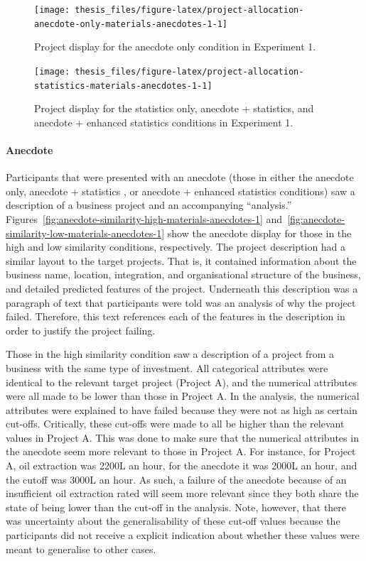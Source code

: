 \documentclass[a4paper, nobind, dvipsnames]{templates/ociamthesis}
\theoremstyle{definition}
\theoremstyle{definition}
\theoremstyle{definition}
\theoremstyle{definition}
\theoremstyle{remark}
\begin{document}
\begin{figure}
\texttt{[image: thesis\_files/figure-latex/project-allocation-anecdote-only-materials-anecdotes-1-1]} \caption{Project display for the anecdote only condition in Experiment 1.}\label{fig:project-allocation-anecdote-only-materials-anecdotes-1}
\end{figure}



\begin{figure}
\texttt{[image: thesis\_files/figure-latex/project-allocation-statistics-materials-anecdotes-1-1]} \caption{Project display for the statistics only, anecdote + statistics, and anecdote + enhanced statistics conditions in Experiment 1.}\label{fig:project-allocation-statistics-materials-anecdotes-1}
\end{figure}

\hypertarget{anecdote}{%
\paragraph{Anecdote}\label{anecdote}}

Participants that were presented with an anecdote (those in either the anecdote
only, anecdote + statistics , or anecdote + enhanced statistics conditions) saw
a description of a business project and an accompanying ``analysis.''
Figures~\ref{fig:anecdote-similarity-high-materials-anecdotes-1}
and~\ref{fig:anecdote-similarity-low-materials-anecdotes-1} show the anecdote
display for those in the high and low similarity conditions, respectively. The
project description had a similar layout to the target projects. That is, it
contained information about the business name, location, integration, and
organisational structure of the business, and detailed predicted features of the
project. Underneath this description was a paragraph of text that participants
were told was an analysis of why the project failed. Therefore, this text
references each of the features in the description in order to justify the
project failing.

Those in the high similarity condition saw a description of a project from a
business with the same type of investment. All categorical attributes were
identical to the relevant target project (Project A), and the numerical
attributes were all made to be lower than those in Project A. In the analysis,
the numerical attributes were explained to have failed because they were not as
high as certain cut-offs. Critically, these cut-offs were made to all be higher
than the relevant values in Project A. This was done to make sure that the
numerical attributes in the anecdote seem more relevant to those in Project A.
For instance, for Project A, oil extraction was 2200L an hour, for the anecdote
it was 2000L an hour, and the cutoff was 3000L an hour. As such, a failure of
the anecdote because of an insufficient oil extraction rated will seem more
relevant since they both share the state of being lower than the cut-off in the
analysis. Note, however, that there was uncertainty about the generalisability
of these cut-off values because the participants did not receive a explicit
indication about whether these values were meant to generalise to other cases.
\end{document}
